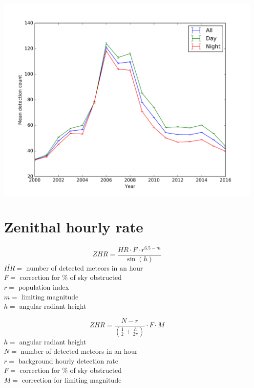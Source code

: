 \documentclass{beamer}
\begin{document}
	\begin{frame}
		\centering
		\includegraphics[width=\linewidth]{YAllcombined}
	\end{frame}

	\section{Zenithal hourly rate}
	\begin{frame}
		\[ {ZHR} = \frac{\overline{HR} \cdot F \cdot r^{6.5-{m}}}{\sin \left( h \right)} \]
		$\overline{HR} =$ number of detected meteors in an hour\\
		$F =$ correction for \% of sky obstructed\\
		$r =$ population index\\
		$m =$ limiting magnitude\\
		$h =$ angular radiant height
	\end{frame}

	\begin{frame}
		\[ {ZHR} = \frac{N - r}{\left( \frac{1}{2} + \frac{h}{2\pi} \right)}
		\cdot F \cdot M \]
		$h =$ angular radiant height\\
		$N =$ number of detected meteors in an hour\\
		$r =$ background hourly detection rate\\
		$F =$ correction for \% of sky obstructed\\
		$M =$ correction for limiting magnitude
	\end{frame}
\end{document}
